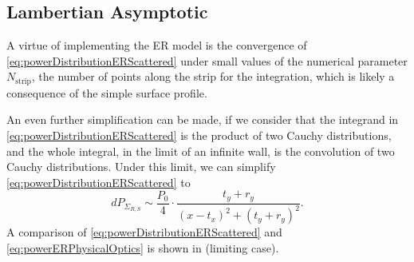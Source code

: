 \documentclass{article}
\begin{document}
\subsection{Lambertian Asymptotic}
A virtue of implementing the ER model is the convergence of
\eqref{eq:powerDistributionERScattered} under small values of the numerical
parameter $N_{\text{strip}}$, the number of points along the strip for the
integration, which is likely a consequence of the simple surface profile.

An even further simplification can be made, if we consider that the integrand in
\eqref{eq:powerDistributionERScattered} is the product of two Cauchy distributions,
and the whole integral, in the limit of an infinite wall, is the convolution of two
Cauchy distributions. Under this limit, we can simplify
\eqref{eq:powerDistributionERScattered} to
\begin{equation}
   dP_{\Sigma_{R,S}} \sim \frac{P_0}{4} \cdot \frac{t_y + r_y}{(x-t_x)^2 + (t_y + r_y)^2}.
   \label{eq:powerERPhysicalOptics}
\end{equation}
A comparison of \eqref{eq:powerDistributionERScattered} and
\eqref{eq:powerERPhysicalOptics} is shown in 
(limiting case).
\end{document}
